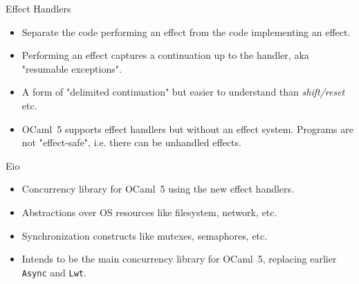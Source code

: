 \documentclass[aspectratio=43]{beamer}
\newcommand{\ocf}{OCaml~5}
\begin{document}
\begin{frame}[fragile]{Effect Handlers}
    \begin{itemize}
        \item Separate the code performing an effect from the code implementing an effect.
        \item Performing an effect captures a continuation up to the handler, aka "resumable exceptions".
        \item A form of "delimited continuation" but easier to understand than \textit{shift/reset} etc.
        \item \ocf{} supports effect handlers but without an effect system. Programs are not "effect-safe", i.e. there can be unhandled effects.
    \end{itemize}
\end{frame}

\begin{frame}{Eio}
    \begin{itemize}
        \item Concurrency library for \ocf{} using the new effect handlers.
        \item Abstractions over OS resources like filesystem, network, etc.
        \item Synchronization constructs like mutexes, semaphores, etc.
        \item Intends to be the main concurrency library for \ocf{}, replacing earlier \texttt{Async} and \texttt{Lwt}.
    \end{itemize}
\end{frame}
\end{document}
